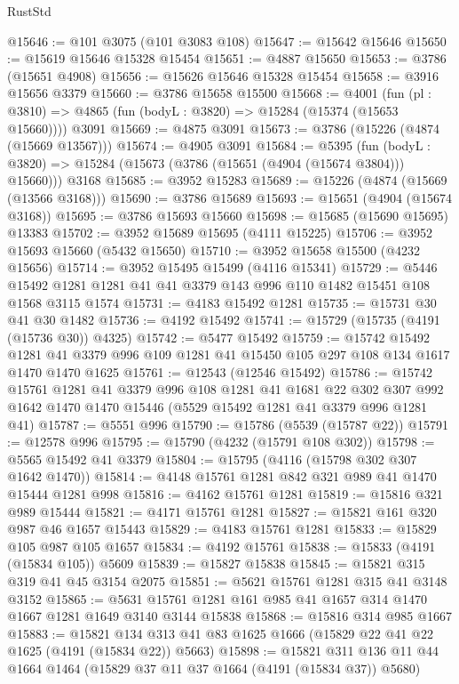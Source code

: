 \begin{lexlean}{RustStd}
\begin{coremodule}
@15646 := @101 @3075 (@101 @3083 @108)
@15647 := @15642 @15646
@15650 := @15619 @15646 @15328 @15454
@15651 := @4887 @15650
@15653 := @3786 (@15651 @4908)
@15656 := @15626 @15646 @15328 @15454
@15658 := @3916 @15656 @3379
@15660 := @3786 @15658 @15500
@15668 := @4001
    (fun (pl : @3810) => @4865 (fun (bodyL : @3820) => @15284 (@15374 (@15653 @15660))))
    @3091
@15669 := @4875 @3091
@15673 := @3786 (@15226 (@4874 (@15669 @13567)))
@15674 := @4905 @3091
@15684 := @5395
    (fun (bodyL : @3820) => @15284 (@15673 (@3786 (@15651 (@4904 (@15674 @3804))) @15660)))
    @3168
@15685 := @3952 @15283
@15689 := @15226 (@4874 (@15669 (@13566 @3168)))
@15690 := @3786 @15689
@15693 := @15651 (@4904 (@15674 @3168))
@15695 := @3786 @15693 @15660
@15698 := @15685 (@15690 @15695) @13383
@15702 := @3952 @15689 @15695 (@4111 @15225)
@15706 := @3952 @15693 @15660 (@5432 @15650)
@15710 := @3952 @15658 @15500 (@4232 @15656)
@15714 := @3952 @15495 @15499 (@4116 @15341)
@15729 := @5446 @15492 @1281 @1281 @41 @41 @3379 @143 @996 @110 @1482 @15451 @108 @1568 @3115 @1574
@15731 := @4183 @15492 @1281
@15735 := @15731 @30 @41 @30 @1482
@15736 := @4192 @15492
@15741 := @15729 (@15735 (@4191 (@15736 @30)) @4325)
@15742 := @5477 @15492
@15759 := @15742
    @15492
    @1281
    @41
    @3379
    @996
    @109
    @1281
    @41
    @15450
    @105
    @297
    @108
    @134
    @1617
    @1470
    @1470
    @1625
@15761 := @12543 (@12546 @15492)
@15786 := @15742
    @15761
    @1281
    @41
    @3379
    @996
    @108
    @1281
    @41
    @1681
    @22
    @302
    @307
    @992
    @1642
    @1470
    @1470
    @15446
    (@5529 @15492 @1281 @41 @3379 @996 @1281 @41)
@15787 := @5551 @996
@15790 := @15786 (@5539 (@15787 @22))
@15791 := @12578 @996
@15795 := @15790 (@4232 (@15791 @108 @302))
@15798 := @5565 @15492 @41 @3379
@15804 := @15795 (@4116 (@15798 @302 @307 @1642 @1470))
@15814 := @4148 @15761 @1281 @842 @321 @989 @41 @1470 @15444 @1281 @998
@15816 := @4162 @15761 @1281
@15819 := @15816 @321 @989 @15444
@15821 := @4171 @15761 @1281
@15827 := @15821 @161 @320 @987 @46 @1657 @15443
@15829 := @4183 @15761 @1281
@15833 := @15829 @105 @987 @105 @1657
@15834 := @4192 @15761
@15838 := @15833 (@4191 (@15834 @105)) @5609
@15839 := @15827 @15838
@15845 := @15821 @315 @319 @41 @45 @3154 @2075
@15851 := @5621 @15761 @1281 @315 @41 @3148 @3152
@15865 := @5631 @15761 @1281 @161 @985 @41 @1657 @314 @1470 @1667 @1281 @1649 @3140 @3144 @15838
@15868 := @15816 @314 @985 @1667
@15883 := @15821 @134 @313 @41 @83 @1625 @1666 (@15829 @22 @41 @22 @1625 (@4191 (@15834 @22)) @5663)
@15898 := @15821 @311 @136 @11 @44 @1664 @1464 (@15829 @37 @11 @37 @1664 (@4191 (@15834 @37)) @5680)

\end{coremodule}
\end{lexlean}
